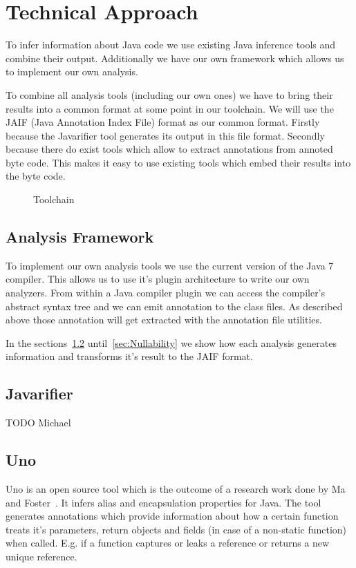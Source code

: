 \section{Technical Approach}
To infer information about Java code we use existing Java inference tools and 
combine their output. Additionally we have our own framework which allows us to
implement our own analysis. 

To combine all analysis tools (including our own ones) we have to bring 
their results into a common format at some point in our toolchain. 
We will use the JAIF (Java Annotation Index File) format as our common format. 
Firstly because the Javarifier tool generates its output in this file format. 
Secondly because there do exist tools which allow to extract annotations from 
annoted byte code. This makes it easy to use existing tools which embed their 
results into the byte code.

\begin{figure}
\centering
{}
\caption{Toolchain}
\label{fig:toolchain}
\end{figure}

\subsection{Analysis Framework}
\label{ss:analysisFramework}

To implement our own analysis tools we use the current version of the Java 7 compiler.
This allows us to use it's plugin architecture to write our own analyzers. From within
a Java compiler plugin we can access the compiler's abstract syntax tree and we can emit 
annotation to the class files. As described above those annotation will get extracted 
with the annotation file utilities.

In the sections~\ref{sec:Javarifier} until~\ref{sec:Nullability} we show how each analysis 
generates information and transforms it's result to the JAIF format.

\subsection{Javarifier}
\label{sec:Javarifier}
TODO Michael


\subsection{Uno}

Uno is an open source tool which is the outcome of a research work done by
Ma and Foster~\cite{Uno}. It infers alias and encapsulation properties for Java.
The tool generates annotations which provide information about how a certain function
treats it's parameters, return objects and fields (in case of a non-static function) 
when called. E.g. if a function captures or leaks a reference or returns a new 
unique reference.

